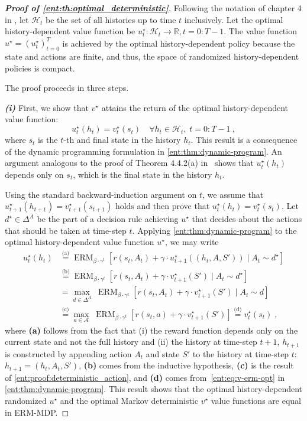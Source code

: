 \documentclass[twoside]{article}
\newcommand{\opt}{^\star}
\newcommand{\erm}[2]{\operatorname{ERM}_{#1}\left[#2\right]}
\newcommand{\Real}{\mathbb{R}}
\theoremstyle{plain}
\theoremstyle{definition}
\theoremstyle{remark}
\renewcommand{\cite}[1]{\citep{#1}}
\begin{document}

\begin{proof}[\bf\em Proof of \cref{ent:th:optimal_deterministic}]
Following the notation of chapter 4 in \cite{Puterman2005}, let $\mathcal{H}_t$ be the set of all histories up to time $t$ inclusively. Let the optimal history-dependent value function be $u_t\opt \colon  \mathcal{H}_t \to \Real, t = 0{:}T{-}1$. The value function $u\opt = (u\opt_t)_{t=0}^{T}$ is achieved by the optimal history-dependent policy because the state and actions are finite, and thus, the space of randomized history-dependent policies is compact.

The proof proceeds in three steps. 

{\bf\em (i)} First, we show that $v\opt$ attains the return of the optimal history-dependent value function:
\[
u\opt_t(h_t) = v\opt_t(s_t) \quad  \forall h_t\in \mathcal{H}_t, \; t = 0{:}T{-}1~,
\]
where $s_t$ is the $t$-th and final state in the history $h_t$. This result is a consequence of the dynamic programming formulation in \cref{ent:thm:dynamic-program}. An argument analogous to the proof of Theorem 4.4.2(a) in~\cite{Puterman2005} shows that $u\opt_t(h_t)$ depends only on $s_t$, which is the final state in the history $h_t$.

Using the standard backward-induction argument on $t$, we assume that $u\opt_{t+1}(h_{t+1}) = v\opt_{t+1}(s_{t+1})$ holds and then prove that $u\opt_t(h_t) = v\opt_t(s_t)$. Let $d^\star \in \Delta^A$ be the part of a decision rule achieving $u\opt$ that decides about the actions that should be taken at time-step $t$. Applying \cref{ent:thm:dynamic-program} to the optimal history-dependent value function $u\opt$, we may write
%
\begin{align*}
  u\opt_t(h_t) &\stackrel{\text{(a)}}{=} \erm{\beta \cdot \gamma^t} {r(s_t,A_t) + \gamma\cdot u_{t+1}\opt ((h_t,A,S')) \mid  A_t \sim d^\star } \\
&\stackrel{\text{(b)}}{=} \erm{\beta \cdot \gamma^t} {r(s_t,A_t) + \gamma\cdot v_{t+1}\opt(S') \mid  A_t \sim d^\star} \\
&= \max_{d\in \Delta^A} \; \erm{\beta \cdot \gamma^t} {r(s_t,A_t) + \gamma\cdot v_{t+1}\opt(S') \mid A_t \sim  d } \\
&\stackrel{\text{(c)}}{=}\max_{a\in \mathcal A} \; \erm{\beta \cdot \gamma^t} {r(s_t,a) + \gamma\cdot v_{t+1}\opt(S')} \stackrel{\text{(d)}}{=} v\opt_t(s_t) \; ,
\end{align*}
%
where {\bf (a)} follows from the fact that (i) the reward function depends only on the current state and not the full history and (ii) the history at time-step $t+1$, $h_{t+1}$ is constructed by appending action $A_t$ and state $S'$ to the history at time-step $t$: $h_{t+1}=(h_t,A_t,S')$, {\bf (b)} comes from the inductive hypothesis, {\bf (c)} is the result of \cref{ent:proof:deterministic_action}, and {\bf (d)} comes from~\eqref{ent:eq:v-erm-opt} in \cref{ent:thm:dynamic-program}. This result shows that the optimal history-dependent randomized $u\opt$ and the optimal Markov deterministic $v\opt$ value functions are equal in ERM-MDP. 


\end{proof}
\end{document}
